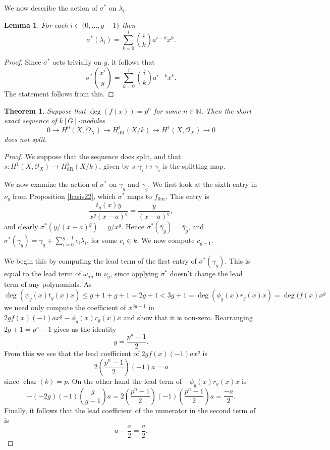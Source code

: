 \documentclass[draft, 11pt]{article} %
\theoremstyle{plain}
\newtheorem{thm}[defn]{Theorem}
\newtheorem{lem}[defn]{Lemma}
\theoremstyle{remark}
\newcommand{\ra}{\rightarrow}
\newcommand{\NN}{{\mathbb N}}
\newcommand{\hzero}{{H^0(X,\Omega_X)}}
\newcommand{\hone}{H^1(X,\mathcal{O}_X)}
\newcommand{\derhamhone}{H_{\text {dR}}^1(X/k)}
\DeclareMathOperator{\cha}{char}
\begin{document}
We now describe the action of $\sigma^*$ on $\lambda_i$.
\begin{lem}
For each $i \in \{ 0, \ldots, g-1\}$ then 
\[
\sigma^*(\lambda_i) = \sum_{k = 0}^i \binom{i}{k}a^{i-k}x^k.
\]
\end{lem}
\begin{proof}
Since $\sigma^*$ acts trivially on $y$, it follows that
\[
\sigma^*\left( \frac{x^i}{y} \right) = \sum_{k=0}^i \binom{i}{k}a^{i-k}x^k.
\]
The statement follows from this.
\end{proof}


\begin{thm}
Suppose that $\deg(f(x)) = p^n $ for some $n \in \NN$.
Then the short exact sequence of $k[G]$-modules
\[
0 \ra \hzero \ra \derhamhone \ra \hone \ra 0
\]
does not split.
\end{thm}
\begin{proof}
We suppose that the sequence does split, and that $s \colon \hone \ra \derhamhone$, given by $s \colon \bar\gamma_i \mapsto \gamma_i$ is the splitting map.

We now examine the action of $\sigma^*$ on $\gamma_g$ and $\bar \gamma_g$.
We first look at the sixth entry in $\nu_g$ from Proposition \ref{basis22}, which $\sigma^*$ maps to $f_{0\infty}$.
This entry is
\[
\frac{t_g(x)y}{x^g(x-a)^g} = \frac{y}{(x-a)^g},
\]
and clearly $\sigma^*(y/(x-a)^g) = y/x^g$.
Hence $\sigma^*(\bar\gamma_g) = \bar \gamma_g$, and $\sigma^*(\gamma_g) = \gamma_g + \sum_{i =0}^{g-1}c_i\lambda_i$, for some $c_i \in k$.
We now compute $c_{g-1}$.

We begin this by computing the lead term of the first entry of $\sigma^*(\gamma_g)$.
This is equal to the lead term of $\omega_{\sigma g}$ in $\nu_g$, since applying $\sigma^*$ doesn't change the lead term of any polynomials.
As
\[
\deg(\psi_g(x)t_g(x)x) \leq g+1 + g+ 1 = 2g+1 < 3g+1 = \deg(\phi_g(x)r_g(x)x) = \deg(f(x)x^g
\]
we need only compute the coefficient of $x^{3g+1}$ in $2gf(x)(-1)ax^g - \phi_g(x)r_g(x)x$ and show that it is non-zero.
Rearranging $2g+1 = p^n - 1$ gives us the identity
\[
g = \frac{p^n - 1}{2}.
\]
From this we see that the lead coefficient of $2gf(x)(-1)ax^g$ is 
\[
2\left( \frac{p^n-1}{2} \right) (-1)a = a
\]
since $\cha(k) = p$.
On the other hand the lead term of $-\phi_g(x)r_g(x)x$ is
\[
-(-2g)(-1)\binom{g}{g-1}a = 2\left(\frac{p^n -1 }{2}\right) (-1)\left( \frac{p^n - 1}{2} \right)a = \frac{-a}{2}.
\]
Finally, it follows that the lead coefficient of the numerator in the second term of is
\[
a - \frac{a}{2} = \frac{a}{2}.
\]



\end{proof}
\end{document}
